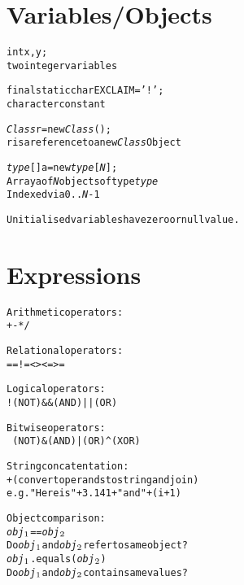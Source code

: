 \documentclass[twocolumn,12pt]{article}
\begin{document}
\section*{Variables/Objects}
\begin{alltt}
int x, y;
   \textrm{two integer variables}

final static char EXCLAIM = '!';
   \textrm{character constant}

\emph{Class} r = new \emph{Class}();
   r \textrm{is a reference to a new} \emph{Class} \textrm{Object}

\emph{type}[] a = new \emph{type}[\emph{N}];
   \textrm{Array} a \textrm{of} \emph{N} \textrm{objects of type} \emph{type}
   \textrm{Indexed via} 0 .. \emph{N}-1

\textrm{Unitialised variables have zero or null value.}
\end{alltt}

\section*{Expressions}
\begin{alltt}
\textrm{Arithmetic operators:}
   +   -   *   /   % \textrm{\footnotesize(modulus)}

\textrm{Relational operators:}
   ==   !=   <   >   <=   >=

\textrm{Logical operators:}
   ! \textrm{\tiny(NOT)}   && \textrm{\tiny(AND)}   || \textrm{\tiny(OR)}

\textrm{Bitwise operators:}
   ~ \textrm{\tiny(NOT)}   & \textrm{\tiny(AND)}   | \textrm{\tiny(OR)}   ^ \textrm{\tiny(XOR)}

\textrm{String concatentation:}
   + \textrm{\footnotesize(convert operands to string and join)}
   \textrm{e.g.} "Here is " + 3.141 + " and " + (i+1)

\textrm{Object comparison:}
   \emph{obj}\(\sb{1}\) == \emph{obj}\(\sb{2}\)
      \textrm{Do} \emph{obj}\(\sb{1}\) \textrm{and} \emph{obj}\(\sb{2}\) \textrm{refer to same object?}
   \emph{obj}\(\sb{1}\).equals(\emph{obj}\(\sb{2}\))
      \textrm{Do} \emph{obj}\(\sb{1}\) \textrm{and} \emph{obj}\(\sb{2}\) \textrm{contain same values?}
\end{alltt}
\end{document}
